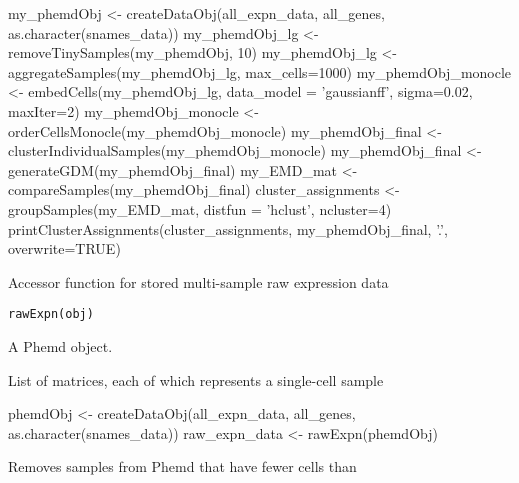 \documentclass[a4paper]{book}
\begin{document}
\begin{Examples}
\begin{ExampleCode}

my_phemdObj <- createDataObj(all_expn_data, all_genes, as.character(snames_data))
my_phemdObj_lg <- removeTinySamples(my_phemdObj, 10)
my_phemdObj_lg <- aggregateSamples(my_phemdObj_lg, max_cells=1000)
my_phemdObj_monocle <- embedCells(my_phemdObj_lg, data_model = 'gaussianff', sigma=0.02, maxIter=2)
my_phemdObj_monocle <- orderCellsMonocle(my_phemdObj_monocle)
my_phemdObj_final <- clusterIndividualSamples(my_phemdObj_monocle)
my_phemdObj_final <- generateGDM(my_phemdObj_final)
my_EMD_mat <- compareSamples(my_phemdObj_final)
cluster_assignments <- groupSamples(my_EMD_mat, distfun = 'hclust', ncluster=4)
printClusterAssignments(cluster_assignments, my_phemdObj_final, '.', overwrite=TRUE)

\end{ExampleCode}
\end{Examples}
%
\begin{Description}\relax
Accessor function for stored multi-sample raw expression data
\end{Description}
%
\begin{Usage}
\begin{verbatim}
rawExpn(obj)
\end{verbatim}
\end{Usage}
%
\begin{Arguments}
\begin{ldescription}
\item[\code{obj}] A Phemd object.
\end{ldescription}
\end{Arguments}
%
\begin{Value}
List of matrices, each of which represents a single-cell sample
\end{Value}
%
\begin{Examples}
\begin{ExampleCode}
phemdObj <- createDataObj(all_expn_data, all_genes, as.character(snames_data))
raw_expn_data <- rawExpn(phemdObj)

\end{ExampleCode}
\end{Examples}
%
\begin{Description}\relax
Removes samples from Phemd that have fewer cells than 
\end{Description}
\end{document}
